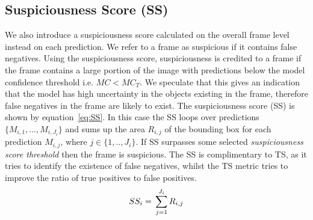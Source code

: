 \subsection{Suspiciousness Score (SS)}
We also introduce a suspiciousness score calculated on the overall frame level instead on each prediction. 
% 
We refer to a frame as suspicious if it contains false negatives. %
%
%
%
%
Using the suspiciousness score, suspiciousness is credited to a frame if the frame contains a large portion of the image with predictions below the model confidence threshold i.e. $MC < MC_T$.
%
We speculate that this gives an indication that the model has high uncertainty in the objects existing in the frame, therefore false negatives in the frame are likely to exist. 
%
%
%
%
%
The suspiciousness score (SS) is shown by equation~\ref{eq:SS}. 
%
In this case the SS loops over predictions $\{M_{i,1},..., M_{i,J_i}\}$ and sums up the area $R_{i,j}$ of the bounding box for each prediction $M_{i,j}$, where $j\in\{1,..,J_i\}$. 
%
If SS surpasses some selected \textit{suspiciousness score threshold} then the frame is suspicious. 
%
The SS is complimentary to TS, as it tries to identify the existence of false negatives, whilst the TS metric tries to improve the ratio of true positives to false positives.
\begin{equation}
    SS_i = \sideset{}{}\sum_{j=1}^{J_i} R_{i,j}
    \label{eq:SS}
\end{equation}



